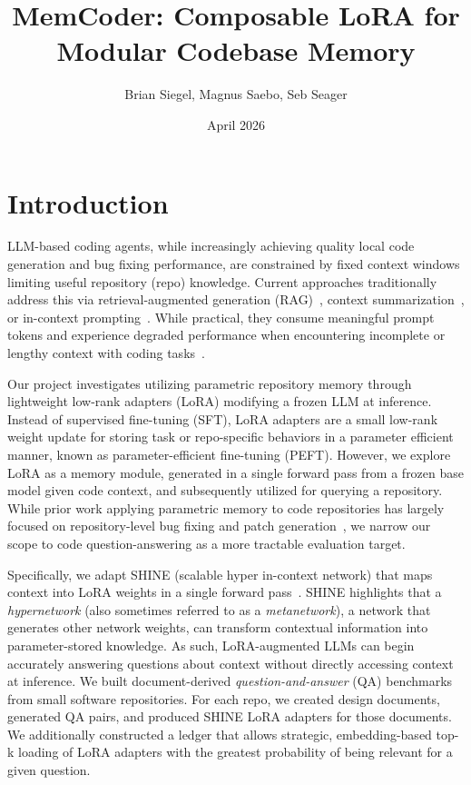 \documentclass[conference,10.5pt]{IEEEtran}
\title{MemCoder: Composable LoRA for Modular Codebase Memory}
\author{Brian Siegel, Magnus Saebo, Seb Seager}
\date{April 2026}
\begin{document}
\maketitle

\section{Introduction}

LLM-based coding agents, while increasingly achieving quality local code generation and bug fixing performance, are constrained by fixed context windows limiting useful repository (repo) knowledge. Current approaches traditionally address this via retrieval-augmented generation (RAG)~\cite{lewis2021retrievalaugmentedgenerationknowledgeintensivenlp}, context summarization~\cite{muLearningCompressPrompts2024}, or in-context prompting~\cite{brownLanguageModelsAre2020}. While practical, they consume meaningful prompt tokens and experience degraded performance when encountering incomplete or lengthy context with coding tasks~\cite{liuLostMiddleHow2023}.

Our project investigates utilizing parametric repository memory through lightweight low-rank adapters (LoRA) modifying a frozen LLM at inference. Instead of supervised fine-tuning (SFT), LoRA adapters are a small low-rank weight update for storing task or repo-specific behaviors in a parameter efficient manner, known as parameter-efficient fine-tuning (PEFT). However, we explore LoRA as a memory module, generated in a single forward pass from a frozen base model given code context, and subsequently utilized for querying a repository. While prior work applying parametric memory to code repositories has largely focused on repository-level bug fixing and patch generation~\cite{jimenezSWEbenchCanLanguage2024}, we narrow our scope to code question-answering as a more tractable evaluation target.

Specifically, we adapt SHINE (scalable hyper in-context network) that maps context into LoRA weights in a single forward pass~\cite{liuSHINEScalableInContext2026}. SHINE highlights that a \textit{hypernetwork} (also sometimes referred to as a \textit{metanetwork}), a network that generates other network weights, can transform contextual information into parameter-stored knowledge. As such, LoRA-augmented LLMs can begin accurately answering questions about context without directly accessing context at inference. We built document-derived \textit{question-and-answer} (QA) benchmarks from small software repositories. For each repo, we created design documents, generated QA pairs, and produced SHINE LoRA adapters for those documents. We additionally constructed a ledger that allows strategic, embedding-based top-k loading of LoRA adapters with the greatest probability of being relevant for a given question.
\end{document}
